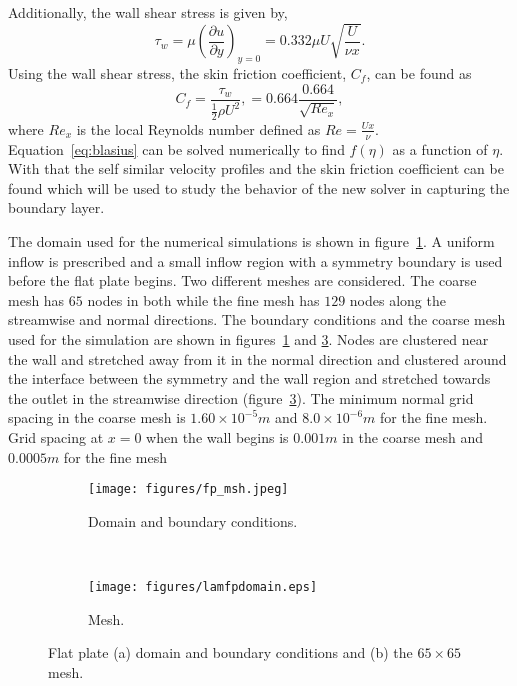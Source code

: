 Additionally, the wall shear stress is given by, 
\begin{equation}
\tau_w = \mu\left(\frac{\partial u}{\partial y}\right)_{y=0} = 0.332\mu U\sqrt{\frac{U}{\nu x}}.
\end{equation}
Using the wall shear stress, the skin friction coefficient, $C_f$, can be found as
\begin{equation}
C_f = \frac{\tau_w}{\frac{1}{2}\rho U^2}, = 0.664\frac{0.664}{\sqrt{Re_x}},
\end{equation}
where $Re_x$ is the local Reynolds number defined as $Re=\frac{U x}{\nu}$. Equation~\ref{eq:blasius} can be solved numerically to find $f(\eta)$ as a function of $\eta$. With that the self similar velocity profiles and the skin friction coefficient can be found which will be used to study the behavior of the new solver in capturing the boundary layer. 

The domain used for the numerical simulations is shown in figure~\ref{fig:lfpdom}. A uniform inflow is prescribed and a small inflow region with a symmetry boundary is used before the flat plate begins. Two different meshes are considered. The coarse mesh has $65$ nodes in both while the fine mesh has $129$ nodes along the streamwise and normal directions. The boundary conditions and the coarse mesh used for the simulation are shown in figures~\ref{fig:lfpdom} and \ref{fig:lfpmesh}. Nodes are clustered near the wall and stretched away from it in the normal direction and clustered around the interface between the symmetry and the wall region and stretched towards the outlet in the streamwise direction (figure~\ref{fig:lfpmesh}). The minimum normal grid spacing in the coarse mesh is $1.60\times10^{-5}m$ and $8.0\times10^{-6}m$ for the fine mesh. Grid spacing at $x=0$ when the wall begins is $0.001m$ in the coarse mesh and $0.0005m$ for the fine mesh
\begin{figure}[h!]
    \centering
    \captionsetup{justification=centering}
    \begin{subfigure}[b]{0.45\textwidth}
    \centering
    \captionsetup{justification=centering}
        \texttt{[image: figures/fp\_msh.jpeg]}
        \caption{Domain and boundary conditions.}
        \label{fig:lfpdom}
    \end{subfigure}
    ~ %
    \begin{subfigure}[b]{0.45\textwidth}
    \centering
    \captionsetup{justification=centering}
        \texttt{[image: figures/lamfpdomain.eps]}
        \caption{Mesh.}
        \label{fig:lfpmesh}
    \end{subfigure}
    \caption{Flat plate (a) domain and boundary conditions and (b) the $65\times65$ mesh.}
\end{figure}

